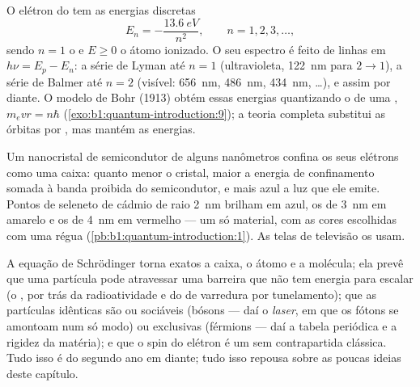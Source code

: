 \begin{proposition}\label{prop:b1:quantum-introduction:hydrogen}
O elétron do  tem as energias discretas
\[
E_n = -\frac{\qty{13.6}{eV}}{n^2} , \qquad n = 1, 2, 3, \ldots ,
\]
sendo $n = 1$ o  e $E \geq 0$ o átomo ionizado. O seu
espectro é feito de linhas em $h\nu = E_p - E_n$: a série de Lyman até
$n = 1$ (ultravioleta, \qty{122}{nm} para $2 \to 1$), a série de Balmer
até $n = 2$ (visível: \qty{656}{nm}, \qty{486}{nm}, \qty{434}{nm}, \ldots),
e assim por diante. O modelo de Bohr (1913) obtém essas energias quantizando o
 de uma , $m_evr = n\hbar$
(\cref{exo:b1:quantum-introduction:9}); a teoria completa substitui as órbitas por
, mas mantém as energias.
\end{proposition}
\admitted

\begin{example}\label{ex:b1:quantum-introduction:dot}
Um nanocristal de semicondutor de alguns nanômetros confina os seus
elétrons como uma caixa: quanto menor o cristal, maior a
energia de confinamento somada à banda proibida do semicondutor, e mais azul a
luz que ele emite. Pontos de seleneto de cádmio de raio \qty{2}{nm} brilham em azul,
os de \qty{3}{nm} em amarelo e os de \qty{4}{nm} em vermelho --- um só material, com as cores escolhidas com
uma régua (\cref{pb:b1:quantum-introduction:1}). As telas de televisão os usam.
\end{example}

\begin{remark}\label{rem:b1:quantum-introduction:rest}
A equação de Schrödinger torna exatos a caixa, o átomo e a molécula;
ela prevê que uma partícula pode atravessar uma barreira que não tem
energia para escalar (o \emph{}, por trás da radioatividade e do
 de varredura por tunelamento); que as partículas idênticas são ou
sociáveis (bósons --- daí o \emph{laser}, em que os fótons se amontoam num só
modo) ou exclusivas (férmions --- daí a tabela periódica e a
rigidez da matéria); e que o spin do elétron é um 
sem contrapartida clássica. Tudo isso é do segundo ano em diante;
tudo isso repousa sobre as poucas ideias deste capítulo.
\end{remark}

